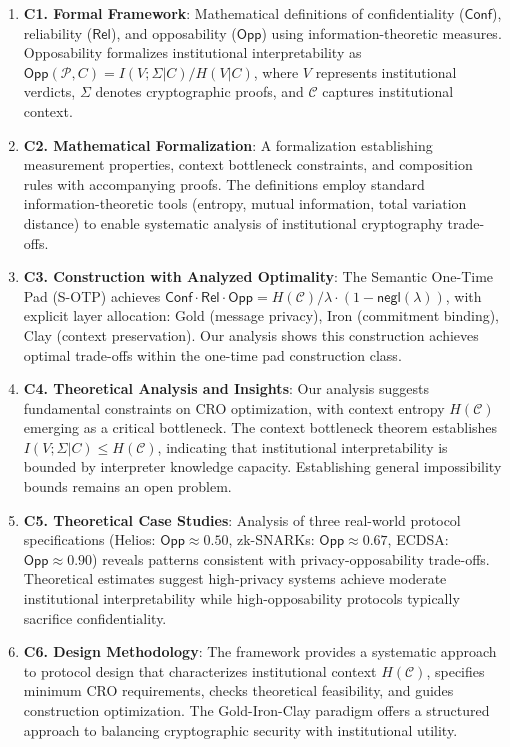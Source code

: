 \documentclass{ieeeaccess}
\begin{document}
\begin{enumerate}
\item \textbf{C1. Formal Framework}: Mathematical definitions of confidentiality ($\mathsf{Conf}$), reliability ($\mathsf{Rel}$), and opposability ($\mathsf{Opp}$) using information-theoretic measures. Opposability formalizes institutional interpretability as $\mathsf{Opp}(\mathcal{P}, C) = I(V;\Sigma|C)/H(V|C)$, where $V$ represents institutional verdicts, $\Sigma$ denotes cryptographic proofs, and $\mathcal{C}$ captures institutional context.

\item \textbf{C2. Mathematical Formalization}: A formalization establishing measurement properties, context bottleneck constraints, and composition rules with accompanying proofs. The definitions employ standard information-theoretic tools (entropy, mutual information, total variation distance) to enable systematic analysis of institutional cryptography trade-offs.

\item \textbf{C3. Construction with Analyzed Optimality}: The Semantic One-Time Pad (S-OTP) achieves $\mathsf{Conf} \cdot \mathsf{Rel} \cdot \mathsf{Opp} = H(\mathcal{C})/\lambda \cdot (1-\mathsf{negl}(\lambda))$, with explicit layer allocation: Gold (message privacy), Iron (commitment binding), Clay (context preservation). Our analysis shows this construction achieves optimal trade-offs within the one-time pad construction class.

\item \textbf{C4. Theoretical Analysis and Insights}: Our analysis suggests fundamental constraints on CRO optimization, with context entropy $H(\mathcal{C})$ emerging as a critical bottleneck. The context bottleneck theorem establishes $I(V;\Sigma|C) \leq H(\mathcal{C})$, indicating that institutional interpretability is bounded by interpreter knowledge capacity. Establishing general impossibility bounds remains an open problem.

\item \textbf{C5. Theoretical Case Studies}: Analysis of three real-world protocol specifications (Helios: $\mathsf{Opp} \approx 0.50$, zk-SNARKs: $\mathsf{Opp} \approx 0.67$, ECDSA: $\mathsf{Opp} \approx 0.90$) reveals patterns consistent with privacy-opposability trade-offs. Theoretical estimates suggest high-privacy systems achieve moderate institutional interpretability while high-opposability protocols typically sacrifice confidentiality.

\item \textbf{C6. Design Methodology}: The framework provides a systematic approach to protocol design that characterizes institutional context $H(\mathcal{C})$, specifies minimum CRO requirements, checks theoretical feasibility, and guides construction optimization. The Gold-Iron-Clay paradigm offers a structured approach to balancing cryptographic security with institutional utility.
\end{enumerate}
\end{document}
